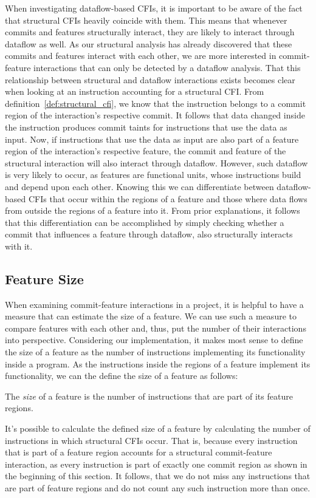 When investigating dataflow-based CFIs, it is important to be aware of the fact that structural CFIs heavily coincide with them.
This means that whenever commits and features structurally interact, they are likely to interact through dataflow as well.
As our structural analysis has already discovered that these commits and features interact with each other, 
we are more interested in commit-feature interactions that can only be detected by a dataflow analysis.
That this relationship between structural and dataflow interactions exists becomes clear when looking at an instruction accounting for a structural CFI.
From definition~\ref{def:structural_cfi}, we know that the instruction belongs to a commit region of the interaction's respective commit.
It follows that data changed inside the instruction produces commit taints for instructions that use the data as input. 
Now, if instructions that use the data as input are also part of a feature region of the interaction's respective feature, the commit and feature of the structural interaction will also interact through dataflow.
However, such dataflow is very likely to occur, as features are functional units, whose instructions build and depend upon each other. 
Knowing this we can differentiate between dataflow-based CFIs that occur within the regions of a feature and those where data flows from outside the regions of a feature into it.
From prior explanations, it follows that this differentiation can be accomplished by simply checking whether a commit that influences a feature through dataflow, also structurally interacts with it. 

\subsection{Feature Size}\label{sec:feature_size}

When examining commit-feature interactions in a project, it is helpful to have a measure that can estimate the size of a feature.
We can use such a measure to compare features with each other and, thus, put the number of their interactions into perspective.
Considering our implementation, it makes most sense to define the size of a feature as the number of instructions implementing its functionality inside a program.
As the instructions inside the regions of a feature implement its functionality, we can the define the size of a feature as follows:
\begin{definition} \label{def:feature_size}
The \emph{size} of a feature is the number of instructions that are part of its feature regions.
\end{definition}
It's possible to calculate the defined size of a feature by calculating the number of instructions in which structural CFIs occur.
That is, because every instruction that is part of a feature region accounts for a structural commit-feature interaction, as every instruction is part of exactly one commit region as shown in the beginning of this section.
It follows, that we do not miss any instructions that are part of feature regions and do not count any such instruction more than once. 

